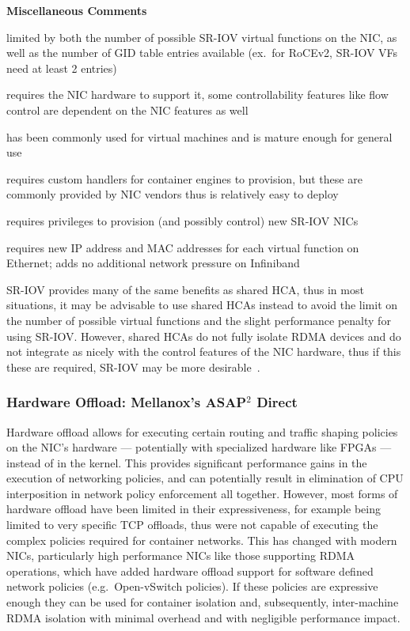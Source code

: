 \documentclass[12pt,titlepage]{article}
\begin{document}
\noindent
\textbf{Miscellaneous Comments}
\begin{description}[nolistsep,font={{\scshape\bfseries}}]
	\item[Scalability Limits] limited by both the number of possible SR-IOV virtual functions on the NIC, as well as the number of GID table entries available (ex.\ for RoCEv2, SR-IOV VFs need at least 2 entries)
	\item[Proprietary] requires the NIC hardware to support it, some controllability features like flow control are dependent on the NIC features as well
	\item[Maturity] has been commonly used for virtual machines and is mature enough for general use
	\item[Ease in Deployment] requires custom handlers for container engines to provision, but these are commonly provided by NIC vendors thus is relatively easy to deploy
	\item[Execution Privileges] requires privileges to provision (and possibly control) new SR-IOV NICs
	\item[Network Pressure] requires new IP address and MAC addresses for each virtual function on Ethernet; adds no additional network pressure on Infiniband
\end{description}

SR-IOV provides many of the same benefits as shared HCA, thus in most situations, it may be advisable to use shared HCAs instead to avoid the limit on the number of possible virtual functions and the slight performance penalty for using SR-IOV\@.
However, shared HCAs do not fully isolate RDMA devices and do not integrate as nicely with the control features of the NIC hardware, thus if this these are required, SR-IOV may be more desirable~\cite{mlnxofedmanual,mellanoxdockersriov}.

\subsubsection{Hardware Offload: Mellanox's ASAP$^2$ Direct}
Hardware offload allows for executing certain routing and traffic shaping policies on the NIC's hardware --- potentially with specialized hardware like FPGAs --- instead of in the kernel.
This provides significant performance gains in the execution of networking policies, and can potentially result in elimination of CPU interposition in network policy enforcement all together.
However, most forms of hardware offload have been limited in their expressiveness, for example being limited to very specific TCP offloads, thus were not capable of executing the complex policies required for container networks.
This has changed with modern NICs, particularly high performance NICs like those supporting RDMA operations, which have added hardware offload support for software defined network policies (e.g.\ Open-vSwitch policies).
If these policies are expressive enough they can be used for container isolation and, subsequently, inter-machine RDMA isolation with minimal overhead and with negligible performance impact.
\end{document}
